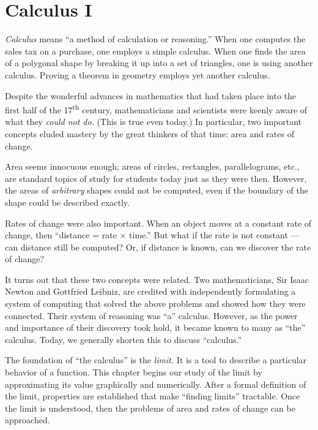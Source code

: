 \part{Calculus I}



\textit{Calculus} means ``a method of calculation or reasoning.'' When one computes the sales tax on a purchase, one employs a simple calculus. When one finds the area of a polygonal shape by breaking it up into a set of triangles, one is using another calculus. Proving a theorem in geometry employs yet another calculus.

Despite the wonderful advances in mathematics that had taken place into the first half of the 17\textsuperscript{th} century, mathematicians and scientists were keenly aware of what they \textit{could not do.} (This is true even today.) In particular, two important concepts eluded mastery by the great thinkers of that time: area and rates of change. 

Area seems innocuous enough; areas of circles, rectangles, parallelograms, etc., are standard topics of study for students today just as they were then. However, the areas of \textit{arbitrary} shapes could not be computed, even if the boundary of the shape could be described exactly. 

Rates of change were also important. When an object moves at a constant rate of change, then ``distance = rate $\times$ time.'' But what if the rate is not constant --- can distance still be computed? Or, if distance is known, can we discover the rate of change?

It turns out that these two concepts were related. Two mathematicians, Sir Isaac Newton and Gottfried Leibniz, are credited with independently formulating a system of computing that solved the above problems and showed how they were connected. Their system of reasoning was ``a'' calculus. However, as the power and importance of their discovery took hold, it became known to many as ``the'' calculus. Today, we generally shorten this to discuss ``calculus.''

The foundation of ``the calculus'' is the \textit{limit.} It is a tool to describe a particular behavior of a function. This chapter begins our study of the limit by approximating its value graphically and numerically. After a formal definition of the limit, properties are established that make ``finding limits'' tractable. Once the limit is understood, then the problems of area and rates of change can be approached.

